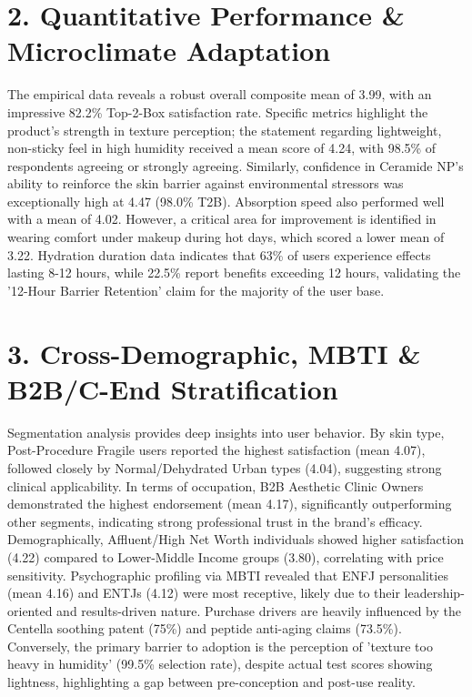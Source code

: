 \documentclass[10pt,twocolumn,a4paper]{article}
\begin{document}
\section{2. Quantitative Performance \& Microclimate Adaptation}
The empirical data reveals a robust overall composite mean of 3.99, with an impressive 82.2\% Top-2-Box satisfaction rate. Specific metrics highlight the product's strength in texture perception; the statement regarding lightweight, non-sticky feel in high humidity received a mean score of 4.24, with 98.5\% of respondents agreeing or strongly agreeing. Similarly, confidence in Ceramide NP’s ability to reinforce the skin barrier against environmental stressors was exceptionally high at 4.47 (98.0\% T2B). Absorption speed also performed well with a mean of 4.02. However, a critical area for improvement is identified in wearing comfort under makeup during hot days, which scored a lower mean of 3.22. Hydration duration data indicates that 63\% of users experience effects lasting 8-12 hours, while 22.5\% report benefits exceeding 12 hours, validating the '12-Hour Barrier Retention' claim for the majority of the user base.
\section{3. Cross-Demographic, MBTI \& B2B/C-End Stratification}
Segmentation analysis provides deep insights into user behavior. By skin type, Post-Procedure Fragile users reported the highest satisfaction (mean 4.07), followed closely by Normal/Dehydrated Urban types (4.04), suggesting strong clinical applicability. In terms of occupation, B2B Aesthetic Clinic Owners demonstrated the highest endorsement (mean 4.17), significantly outperforming other segments, indicating strong professional trust in the brand's efficacy. Demographically, Affluent/High Net Worth individuals showed higher satisfaction (4.22) compared to Lower-Middle Income groups (3.80), correlating with price sensitivity. Psychographic profiling via MBTI revealed that ENFJ personalities (mean 4.16) and ENTJs (4.12) were most receptive, likely due to their leadership-oriented and results-driven nature. Purchase drivers are heavily influenced by the Centella soothing patent (75\%) and peptide anti-aging claims (73.5\%). Conversely, the primary barrier to adoption is the perception of 'texture too heavy in humidity' (99.5\% selection rate), despite actual test scores showing lightness, highlighting a gap between pre-conception and post-use reality.
\end{document}
